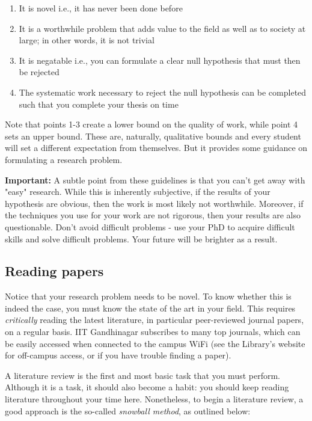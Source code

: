 \documentclass[12pt]{article}
\begin{document}
\begin{enumerate}
	\item It is novel i.e., it has never been done before
	\item It is a worthwhile problem that adds value to the field as well as to society at large; in other words, it is not trivial
	\item It is negatable i.e., you can formulate a clear null hypothesis that must then be rejected
	\item The systematic work necessary to reject the null hypothesis can be completed such that you complete your thesis on time
\end{enumerate}

Note that points 1-3 create a lower bound on the quality of work, while point 4 sets an upper bound. These are, naturally, qualitative bounds and every student will set a different expectation from themselves. But it provides some guidance on formulating a research problem. 

\textbf{Important:} A subtle point from these guidelines is that you can't get away with "easy" research. While this is inherently subjective, if the results of your hypothesis are obvious, then the work is most likely not worthwhile. Moreover, if the techniques you use for your work are not rigorous, then your results are also questionable. Don't avoid difficult problems - use your PhD to acquire difficult skills and solve difficult problems. Your future will be brighter as a result.

\subsection{Reading papers}
Notice that your research problem needs to be novel. To know whether this is indeed the case, you must know the state of the art in your field. This requires \textit{critically} reading the latest literature, in particular peer-reviewed journal papers, on a regular basis. IIT Gandhinagar subscribes to many top journals, which can be easily accessed when connected to the campus WiFi (see the Library's website for off-campus access, or if you have trouble finding a paper).

A literature review is the first and most basic task that you must perform. Although it is a task, it should also become a habit: you should keep reading literature throughout your time here. Nonetheless, to begin a literature review, a good approach is the so-called \textit{snowball method}, as outlined below:
\end{document}

